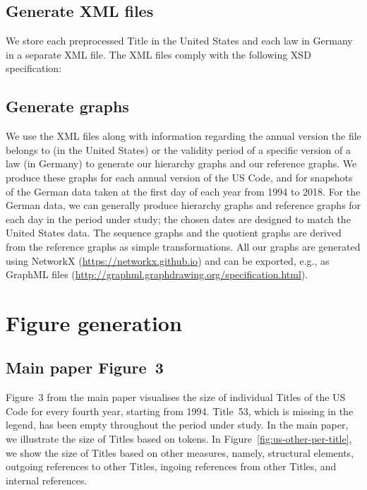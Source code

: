\subsection{Generate XML files}

We store each preprocessed Title in the United States and each law in Germany in a separate XML file. 
The XML files comply with the following XSD specification:

\lstset{basicstyle=\small}


\subsection{Generate graphs}

We use the XML files along with information regarding the annual version the file belongs to (in the United States) 
or the validity period of a specific version of a law (in Germany)
to generate our hierarchy graphs and our reference graphs. 
We produce these graphs for each annual version of the US Code, 
and for snapshots of the German data taken at the first day of each year from 1994 to 2018.
For the German data, we can generally produce hierarchy graphs and reference graphs for each day in the period under study; 
the chosen dates are designed to match the United States data.
The sequence graphs and the quotient graphs are derived from the reference graphs as simple transformations.
All our graphs are generated using NetworkX (\url{https://networkx.github.io}) and can be exported, e.g.,
as GraphML files (\url{http://graphml.graphdrawing.org/specification.html}). 

\section{Figure generation}

\subsection{Main paper Figure~3} %

Figure~3 from the main paper %
visualises the size of individual Titles of the US Code for every fourth year, 
starting from 1994. 
Title~53, which is missing in the legend, has been empty throughout the period under study.
In the main paper, %
we illustrate the size of Titles based on tokens.
In Figure~\ref{fig:us-other-per-title}, 
we show the size of Titles based on other measures, 
namely, structural elements, outgoing references to other Titles, ingoing references from other Titles, and internal references.

